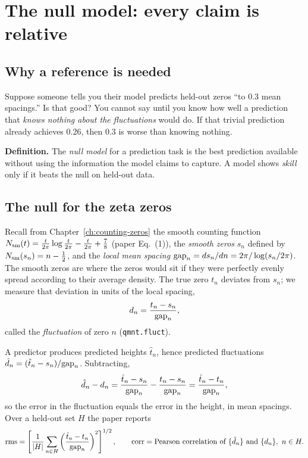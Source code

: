 \section{The null model: every claim is relative}\label{sec:generalization-null}

\subsection{Why a reference is needed}

Suppose someone tells you their model predicts held-out zeros ``to 0.3 mean spacings.'' Is that good? You cannot say until you know how well a prediction that \emph{knows nothing about the fluctuations} would do. If that trivial prediction already achieves 0.26, then 0.3 is worse than knowing nothing.

\textbf{Definition.} The \emph{null model} for a prediction task is the best prediction available without using the information the model claims to capture. A model shows \emph{skill} only if it beats the null on held-out data.

\subsection{The null for the zeta zeros}

Recall from Chapter~\ref{ch:counting-zeros} the smooth counting function $N_{\mathrm{sm}}(t)=\frac{t}{2\pi}\log\frac{t}{2\pi}-\frac{t}{2\pi}+\frac78$ (paper Eq.~(1)), the \emph{smooth zeros} $s_n$ defined by $N_{\mathrm{sm}}(s_n)=n-\tfrac12$, and the \emph{local mean spacing} $\mathrm{gap}_n=ds_n/dn=2\pi/\log(s_n/2\pi)$. The smooth zeros are where the zeros would sit if they were perfectly evenly spread according to their average density. The true zero $t_n$ deviates from $s_n$; we measure that deviation in units of the local spacing,
\begin{equation}
d_n=\frac{t_n-s_n}{\mathrm{gap}_n},
\label{eq:generalization-dn}
\end{equation}
called the \emph{fluctuation} of zero $n$ (\texttt{qmnt.fluct}).

A predictor produces predicted heights $\hat t_n$, hence predicted fluctuations $\hat d_n=(\hat t_n-s_n)/\mathrm{gap}_n$. Subtracting,
\begin{equation}
\hat d_n-d_n=\frac{\hat t_n-s_n}{\mathrm{gap}_n}-\frac{t_n-s_n}{\mathrm{gap}_n}=\frac{\hat t_n-t_n}{\mathrm{gap}_n},
\label{eq:generalization-diff}
\end{equation}
so the error in the fluctuation equals the error in the height, in mean spacings. Over a held-out set $H$ the paper reports
\begin{equation}
\mathrm{rms}=\left[\frac{1}{|H|}\sum_{n\in H}\left(\frac{\hat t_n-t_n}{\mathrm{gap}_n}\right)^2\right]^{1/2},
\qquad
\mathrm{corr}=\text{Pearson correlation of }\{\hat d_n\}\text{ and }\{d_n\},\ n\in H.
\label{eq:generalization-score}
\end{equation}


